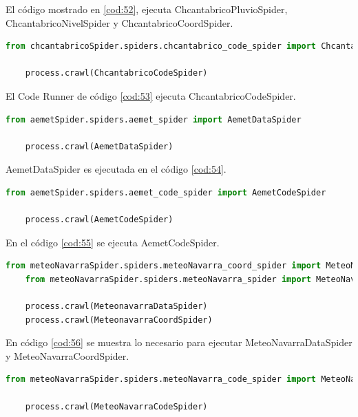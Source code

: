 El código mostrado en \ref{cod:52}, ejecuta ChcantabricoPluvioSpider, ChcantabricoNivelSpider y ChcantabricoCoordSpider.

\begin{lstlisting}[language=Python, caption={CHCantábrico Code Runner}, label=cod:53]
	from chcantabricoSpider.spiders.chcantabrico_code_spider import ChcantabricoCodeSpider

	process.crawl(ChcantabricoCodeSpider)
\end{lstlisting}

El Code Runner de código \ref{cod:53} ejecuta ChcantabricoCodeSpider.

\begin{lstlisting}[language=Python, caption={Aemet Data Runner}, label=cod:54]
	from aemetSpider.spiders.aemet_spider import AemetDataSpider

	process.crawl(AemetDataSpider)
\end{lstlisting}

AemetDataSpider es ejecutada en el código \ref{cod:54}.

\begin{lstlisting}[language=Python, caption={Aemet Code Runner}, label=cod:55]
	from aemetSpider.spiders.aemet_code_spider import AemetCodeSpider
	
	process.crawl(AemetCodeSpider)
\end{lstlisting}

En el código \ref{cod:55} se ejecuta AemetCodeSpider.

\begin{lstlisting}[language=Python, caption={MeteoNavarra Data Runner}, label=cod:56]
	from meteoNavarraSpider.spiders.meteoNavarra_coord_spider import MeteoNavarraCoordSpider
	from meteoNavarraSpider.spiders.meteoNavarra_spider import MeteoNavarraDataSpider

	process.crawl(MeteonavarraDataSpider)
	process.crawl(MeteonavarraCoordSpider)	
\end{lstlisting}

En código \ref{cod:56} se muestra lo necesario para ejecutar MeteoNavarraDataSpider y MeteoNavarraCoordSpider.

\begin{lstlisting}[language=Python, caption={MeteoNavarra Code Runner}, label=cod:57]
	from meteoNavarraSpider.spiders.meteoNavarra_code_spider import MeteoNavarraCodeSpider

	process.crawl(MeteoNavarraCodeSpider)
\end{lstlisting}

